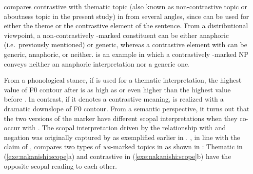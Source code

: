 \citet{nakanishi:07} compares contrastive  with thematic topic
(also known as non-contrastive topic or aboutness topic in the present
study) in  from several angles, since \wa can be used
for either the theme or the contrastive element of the sentence. From
a distributional viewpoint, a non-contrastively \wa-marked
constituent can be either anaphoric (i.e.\ previously mentioned) or
generic, whereas a contrastive element with \wa can be generic,
anaphoric, or neither.  is an example in
which a contrastively \wa-marked NP conveys neither an anaphoric
interpretation nor a generic one.




\noindent From a phonological stance, if \wa is used for a thematic
interpretation, the highest value of F0 contour after \wa is as high
as or even higher than the highest value before \wa.
In contrast, if it denotes a contrastive meaning,
\wa is realized with a dramatic
downslope of F0 contour.  From a semantic perspective, it turns out
that the two versions of the marker have different scopal
interpretations when they co-occur with . The scopal
interpretation driven by the relationship with  and negation was
originally captured by \citet{buring:97} as exemplified earlier in
. \citeauthor{nakanishi:07}, in line with the
claim of \citeauthor{buring:97}, compares two types of
\textit{wa}-marked topics in  as shown in
: Thematic \wa in
(\ref{exe:nakanishi:scope}a) and contrastive \wa in
(\ref{exe:nakanishi:scope}b) have the opposite scopal reading to each
other.





